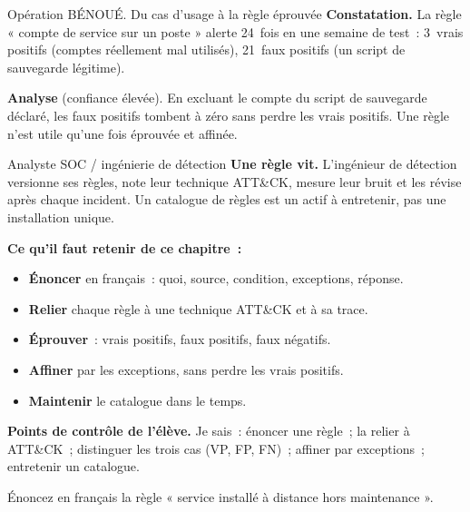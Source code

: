 \begin{boxscenario}{Opération BÉNOUÉ. Du cas d'usage à la règle éprouvée}
\textbf{Constatation.} La règle « compte de service sur un poste » alerte
24~fois en une semaine de test~: 3~vrais positifs (comptes réellement mal
utilisés), 21~faux positifs (un script de sauvegarde légitime).

\medskip
\textbf{Analyse} (confiance élevée). En excluant le compte du script de
sauvegarde déclaré, les faux positifs tombent à zéro sans perdre les vrais
positifs. Une règle n'est utile qu'une fois éprouvée et affinée.
\end{boxscenario}

\begin{boxmetier}{Analyste SOC / ingénierie de détection}
\textbf{Une règle vit.} L'ingénieur de détection versionne ses règles, note
leur technique ATT\&CK, mesure leur bruit et les révise après chaque
incident. Un catalogue de règles est un actif à entretenir, pas une
installation unique.
\end{boxmetier}

\separateur

\begin{boxresume}
\textbf{Ce qu'il faut retenir de ce chapitre~:}
\begin{itemize}
    \item \textbf{Énoncer} en français~: quoi, source, condition, exceptions,
          réponse.
    \item \textbf{Relier} chaque règle à une technique ATT\&CK et à sa trace.
    \item \textbf{Éprouver}~: vrais positifs, faux positifs, faux négatifs.
    \item \textbf{Affiner} par les exceptions, sans perdre les vrais positifs.
    \item \textbf{Maintenir} le catalogue dans le temps.
\end{itemize}
\end{boxresume}

\begin{boxinfo}
\textbf{Points de contrôle de l'élève.} Je sais~: énoncer une règle~; la
relier à ATT\&CK~; distinguer les trois cas (VP, FP, FN)~; affiner par
exceptions~; entretenir un catalogue.
\end{boxinfo}

\bigskip

\begin{boxexo}[title={\ding{45}\quad Exercice~7.1. Énoncer \niveaubase}]
Énoncez en français la règle « service installé à distance hors maintenance ».
\end{boxexo}

